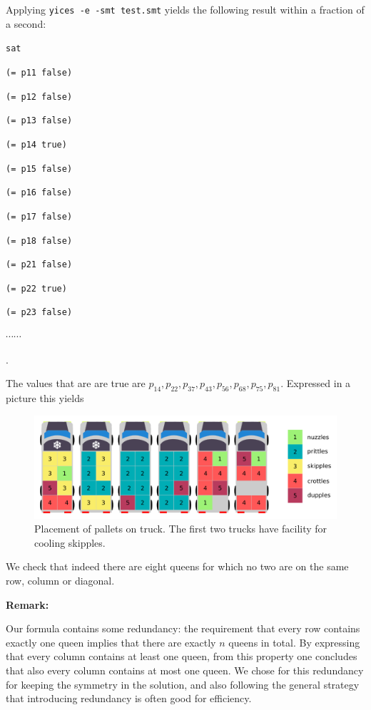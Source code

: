 \documentclass[a4paper]{article}
\begin{document}
Applying {\tt yices -e -smt test.smt} yields the following result
within a fraction of a second:

{\footnotesize

{\tt sat }

{\tt (= p11 false)}

{\tt (= p12 false)}

{\tt (= p13 false)}

{\tt (= p14 true)}

{\tt (= p15 false)}

{\tt (= p16 false)}

{\tt (= p17 false)}

{\tt (= p18 false)}

{\tt (= p21 false)}

{\tt (= p22 true)}

{\tt (= p23 false)}

$\cdots \cdots$ }.

The values that are are true are $p_{14}, p_{22}, p_{37}, p_{43},
p_{56}, p_{68}, p_{75}, p_{81}$. Expressed in a picture this
yields

\begin{figure}[H]
			\centering
				\includegraphics[scale=1]{trucks.png}
			\caption{Placement of pallets on truck. The first two trucks have facility for cooling skipples.}
		\end{figure}

We check that indeed there are eight queens for which no two are
on the same row, column or diagonal.

\vspace{3mm}

{\bf Remark:} 

Our formula contains some redundancy: the requirement that every
row contains exactly one queen implies that there are exactly $n$
queens in total. By expressing that every column contains at least
one queen, from this property one concludes that also every column
contains at most one queen. We chose for this redundancy for
keeping the symmetry in the solution, and also following the
general strategy that introducing redundancy is often good for
efficiency.
\end{document}

